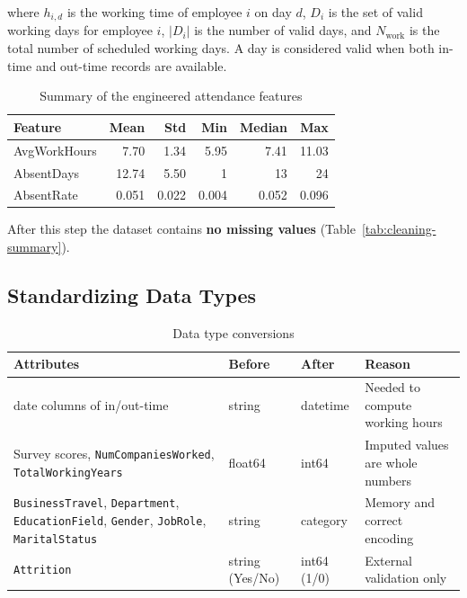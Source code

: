 \documentclass[12pt,a4paper]{article}
\begin{document}
\noindent
where $h_{i,d}$ is the working time of employee $i$ on day $d$,
$D_i$ is the set of valid working days for employee $i$,
$|D_i|$ is the number of valid days, and $N_{\text{work}}$
is the total number of scheduled working days.
A day is considered valid when both in-time and out-time
records are available.

\begin{table}[H]
\centering
\caption{Summary of the engineered attendance features}
\label{tab:att-features}
\small
\begin{tabular}{lrrrrr}
\toprule
\textbf{Feature} & \textbf{Mean} & \textbf{Std} & \textbf{Min}
& \textbf{Median} & \textbf{Max}\\
\midrule
AvgWorkHours & 7.70  & 1.34 & 5.95  & 7.41  & 11.03\\
AbsentDays   & 12.74 & 5.50 & 1     & 13    & 24\\
AbsentRate   & 0.051 & 0.022 & 0.004 & 0.052 & 0.096\\
\bottomrule
\end{tabular}
\end{table}

After this step the dataset contains \textbf{no missing values}
(Table~\ref{tab:cleaning-summary}).

\subsection{Standardizing Data Types}

\begin{table}[H]
\centering
\caption{Data type conversions}
\label{tab:dtype-conversion}
\small
\begin{tabularx}{\textwidth}{>{\raggedright\arraybackslash}X l l >{\raggedright\arraybackslash}X}
\toprule
\textbf{Attributes} & \textbf{Before} & \textbf{After} & \textbf{Reason}\\
\midrule
261 date columns of in/out-time & string & datetime & Needed to compute working hours\\
Survey scores, \texttt{NumCompaniesWorked}, \texttt{TotalWorkingYears}
  & float64 & int64 & Imputed values are whole numbers\\
\texttt{BusinessTravel}, \texttt{Department}, \texttt{EducationField},
  \texttt{Gender}, \texttt{JobRole}, \texttt{MaritalStatus}
  & string & category & Memory and correct encoding\\
\texttt{Attrition} & string (Yes/No) & int64 (1/0) & External validation only\\
\bottomrule
\end{tabularx}
\end{table}
\end{document}
